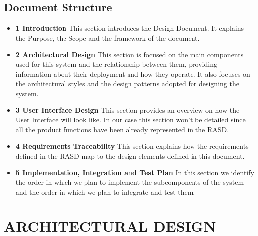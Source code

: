 \documentclass[12pt,a4paper]{article}
\begin{document}
\subsection{Document Structure}
\begin{itemize}
\item \textbf{1 Introduction} 
This section introduces the Design Document. It explains the Purpose, the Scope and the framework of the document.
\item \textbf{2 Architectural Design}
This section is focused on the main components used for this system and the relationship between them, providing information about their deployment and how they operate. It also focuses on the architectural
styles and the design patterns adopted for designing the system.
\item \textbf{3 User Interface Design}
This section provides an overview on how the User Interface will look like. In our case this section won't be detailed since all the product
functions have been already represented in the RASD.
\item \textbf{4 Requirements Traceability}
This section explains how the requirements defined in the RASD map to the design elements defined in this document.
\item \textbf{5 Implementation, Integration and Test Plan}
In this section we identify the order in which we plan to implement the subcomponents of the system and the order in which we plan to
integrate and test them.
\end{itemize}
\newpage
\section{ARCHITECTURAL DESIGN}
\end{document}
